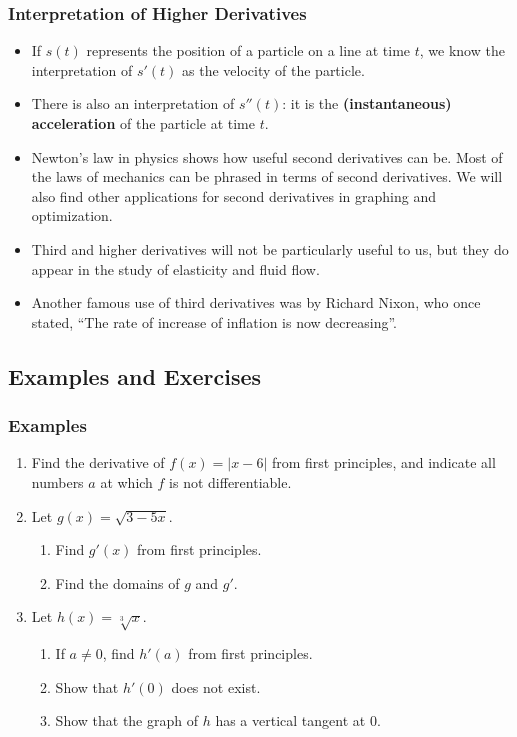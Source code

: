 \documentclass[serif,ignorenonframetext]{beamer}
\newcommand{\ds}{\displaystyle}
\begin{document}
\begin{frame}
  \frametitle{Interpretation of Higher Derivatives}
  \begin{itemize}
  \item If $s(t)$ represents the position of a particle on a line at
    time $t$, we know the interpretation of $s'(t)$ as the velocity of 
    the particle.
  \pause
  \item There is also an interpretation of $s''(t)$: it is the 
    \textbf{(instantaneous) acceleration} of the particle at time $t$.
  \pause
  \item Newton's law in physics shows how useful second derivatives can
    be.  Most of the laws of mechanics can be phrased in terms of second
    derivatives.
    We will also find other applications for second derivatives in
    graphing and optimization.
  \pause
  \item Third and higher derivatives will not be particularly useful to
    us, but they do appear in the study of elasticity and fluid flow.
  \pause
  \item Another famous use of third derivatives was by Richard Nixon,
    who once stated, ``The rate of increase of inflation is now decreasing''.
  \end{itemize}
\end{frame}


\subsection{Examples and Exercises}

\begin{frame}
  \frametitle{Examples}
  \begin{enumerate}
  \item Find the derivative of $f(x)=|x-6|$ from first principles,
    and indicate all numbers $a$ at which $f$ is not differentiable.
  \item Let $\ds g(x) = \sqrt{3-5x}$.
    \begin{enumerate}
    \item Find $g'(x)$ from first principles.
    \item Find the domains of $g$ and $g'$.
    \end{enumerate}
  \item Let $\ds h(x)=\sqrt[3]{x}$.
    \begin{enumerate}
    \item If $a\ne 0$, find $h'(a)$ from first principles.
    \item Show that $h'(0)$ does not exist.
    \item Show that the graph of $h$ has a vertical tangent at $0$.
    \end{enumerate}
  \end{enumerate} 
\end{frame}
\end{document}
